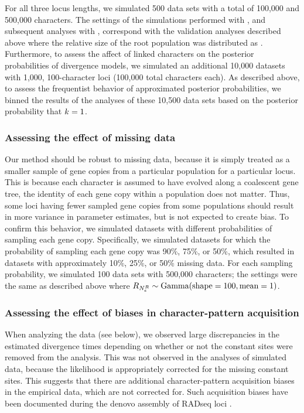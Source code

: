 For all three locus lengths, we simulated 500 data sets with a total of 100,000
and 500,000 characters.
The settings of the simulations performed with \simcoevolity, and subsequent
analyses with \ecoevolity, correspond with the validation analyses described
above where the relative size of the root population was distributed as
.
Furthermore, to assess the affect of linked characters on the posterior
probabilities of divergence models, we simulated an additional 10,000 datasets
with 1,000, 100-character loci (100,000 total characters each).
As described above, to assess the frequentist behavior of approximated
posterior probabilities, we binned the results of the analyses of these 10,500
data sets based on the posterior probability that $k_{} = 1$.

\subsubsection{Assessing the effect of missing data}
Our method should be robust to missing data, because it is simply treated as a
smaller sample of gene copies from a particular population for a particular
locus.
This is because each character is assumed to have evolved along a coalescent
gene tree, the identity of each gene copy within a population does not matter.
Thus, some loci having fewer sampled gene copies from some populations should
result in more variance in parameter estimates, but is not expected to create
bias.
To confirm this behavior, we simulated datasets with different probabilities of
sampling each gene copy.
Specifically, we simulated datasets for which the probability of sampling each
gene copy was 90\%, 75\%, or 50\%, which resulted in datasets with
approximately 10\%, 25\%, or 50\% missing data.
For each sampling probability, we simulated 100 data sets with 500,000
characters; the settings were the same as described above where
$R_{N_{e}^{R{}}} \sim \textrm{Gamma}(\textrm{shape} = 100, \textrm{mean} = 1)$.

\subsubsection{Assessing the effect of biases in character-pattern acquisition}
When analyzing the  data (see below), we observed large
discrepancies in the estimated divergence times depending on whether or not the
constant sites were removed from the analysis.
This was not observed in the analyses of simulated data, because the likelihood
is appropriately corrected for the missing constant sites.
This suggests that there are additional character-pattern acquisition biases in
the empirical data, which are not corrected for.
Such acquisition biases have been documented during the denovo assembly of
RADseq loci \citep{Harvey2015,Linck2017}.

